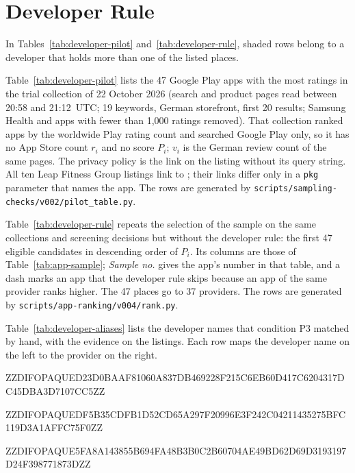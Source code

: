 \documentclass[twoside,its]{bossthesis}
\begin{document}
\section{Developer Rule}
\label{app:developer-rule}
In Tables~\ref{tab:developer-pilot} and~\ref{tab:developer-rule}, shaded rows
belong to a developer that holds more than one of the listed places.

Table~\ref{tab:developer-pilot} lists the 47 Google Play apps with the most
ratings in the trial collection of 22 October 2026 (search and product pages
read between 20:58 and 21:12~UTC; 19 keywords, German storefront, first 20
results; Samsung Health and apps with fewer than 1{,}000 ratings removed). That
collection ranked apps by the worldwide Play rating count and searched Google
Play only, so it has no App Store count $r_i$ and no score $P_i$; $v_i$ is the
German review count of the same pages. The privacy policy is the link on the
listing without its query string. All ten Leap Fitness Group listings link to
; their links differ only in a
\texttt{pkg} parameter that names the app. The rows are generated by
\texttt{scripts/sampling-checks/v002/pilot\_table.py}.

Table~\ref{tab:developer-rule} repeats the selection of the sample on the same
collections and screening decisions but without the developer rule: the first
47 eligible candidates in descending order of $P_i$. Its columns are those of
Table~\ref{tab:app-sample}; \emph{Sample no.} gives the app's number in that
table, and a dash marks an app that the developer rule skips because an app of
the same provider ranks higher. The 47 places go to 37 providers. The rows are
generated by \texttt{scripts/app-ranking/v004/rank.py}.

Table~\ref{tab:developer-aliases} lists the developer names that condition P3
matched by hand, with the evidence on the listings. Each row maps the developer
name on the left to the provider on the right.

\begin{landscape}
\begin{singlespace}
\small
\setlength{\tabcolsep}{4pt}


ZZDIFOPAQUED23D0BAAF81060A837DB469228F215C6EB60D417C6204317DC45DBA3D7107CC5ZZ





ZZDIFOPAQUEDF5B35CDFB1D52CD65A297F20996E3F242C04211435275BFC119D3A1AFFC75F0ZZ



\setlength{\tabcolsep}{4pt}


ZZDIFOPAQUE5FA8A143855B694FA48B3B0C2B60704AE49BD62D69D3193197D24F398771873DZZ


\end{singlespace}
\end{landscape}
\end{document}
